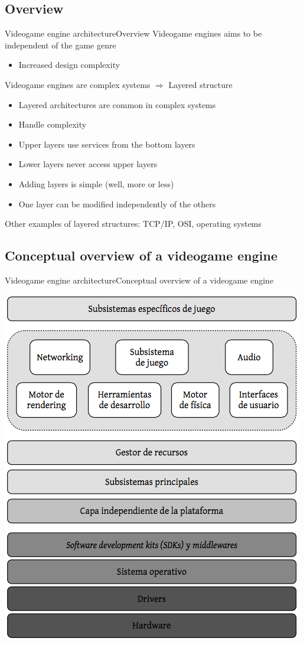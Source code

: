 \documentclass[10pt,compress]{beamer} %
\begin{document}
\subsection{Overview}
\begin{frame}{Videogame engine architecture}{Overview}
	Videogame engines aims to be independent of the game genre
	\begin{itemize}
		\item Increased design complexity
	\end{itemize}

	Videogame engines are complex systems $\Rightarrow$ Layered structure
	\begin{itemize}
		\item Layered architectures are common in complex systems
		\item Handle complexity
		\item Upper layers use services from the bottom layers
		\item Lower layers never access upper layers
		\item Adding layers is simple (well, more or less)
		\item One layer can be modified independently of the others
	\end{itemize}

	Other examples of layered structures: TCP/IP, OSI, operating systems
\end{frame}

\subsection{Conceptual overview of a videogame engine}
\begin{frame}[plain]{Videogame engine architecture}{Conceptual overview of a videogame engine}
	\begin{center}
		\includegraphics[width=0.6\linewidth]{figs/layers}
	\end{center}
\end{frame}
\end{document}
